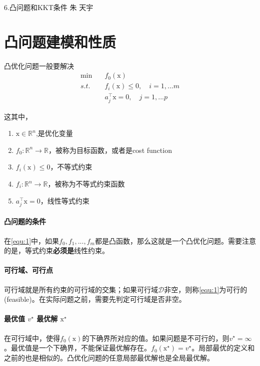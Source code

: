 \documentclass[a4paper]{D:/MyRepo/Script/latex/PaperReadingLog}
\begin{document}
\PaperInfo
{6.凸问题和KKT条件}
{朱}
{天宇}
{}

\section{凸问题建模和性质}
凸优化问题一般要解决
\begin{equation}
    \label{equ:1}
    \begin{aligned}
        \min\quad&f_0(\mathrm{x})\\
        s.t.\quad&f_i(\mathrm{x})\le0,\quad i=1,...m\\
        &a_j^\top \mathrm{x}=0,\quad j=1,...p
    \end{aligned}
\end{equation}

这其中，\begin{enumerate}
    \item $\mathrm{x}\in\mathbb{R}^n$,是优化变量
    \item $f_0:\mathbb{R}^n\rightarrow \mathbb{R}$，被称为目标函数，或者是cost function
    \item $f_i(\mathrm{x})\le0$，不等式约束
    \item $f_i:\mathbb{R}^n\rightarrow \mathbb{R}$，被称为不等式约束函数
    \item $a_j^\top \mathrm{x}=0$，线性等式约束
\end{enumerate}

\paragraph{凸问题的条件} 在\ref{equ:1}中，如果$f_0,f_1,...,f_m$都是凸函数，那么这就是一个凸优化问题。需要注意的是，等式约束\textbf{必须是}线性约束。

\paragraph{可行域、可行点}
可行域就是所有约束的可行域的交集；如果可行域$\mathcal{D}$非空，则称\ref{equ:1}为可行的(feasible)。在实际问题之前，需要先判定可行域是否非空。

\paragraph{最优值 $v^\star$ 最优解 $\mathrm{x}^\star$}  在可行域中，使得$f_0(\mathrm{x})$的下确界所对应的值。如果问题是不可行的，则$v^\star=\infty$。最优值是一个下确界，不能保证最优解存在。$f_0(\mathrm{x}^\star)=v^\star$。局部最优的定义和之前的也是相似的。凸优化问题的任意局部最优解也是全局最优解。
\end{document}

